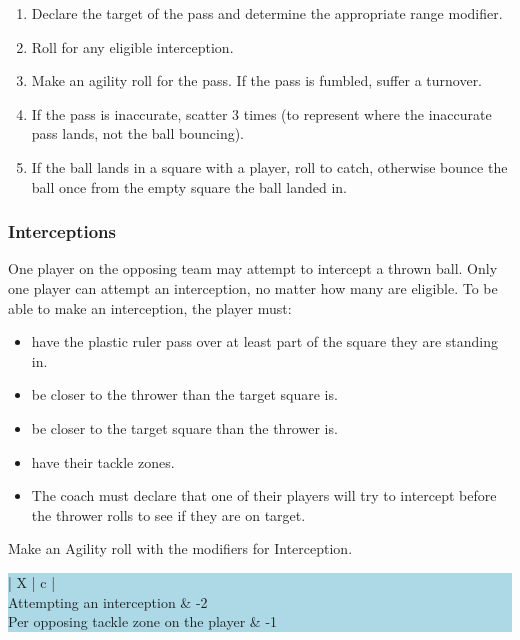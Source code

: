 \begin{multicols}{2}
\begin{enumerate}
\item Declare the target of the pass and determine the appropriate range modifier.
\item Roll for any eligible interception.
\item Make an agility roll for the pass. If the pass is fumbled, suffer a turnover.
\item If the pass is inaccurate, scatter 3 times (to represent where the inaccurate pass lands, not the ball bouncing).
\item If the ball lands in a square with a player, roll to catch, otherwise bounce the ball once from the empty square the ball landed in.
\end{enumerate}

\subsubsection{Interceptions}
\par One player on the opposing team may attempt to intercept a thrown ball. Only one player can attempt an interception, no matter how many are eligible. To be able to make an interception, the player must:

\begin{itemize}
\item have the plastic ruler pass over at least part of the square they are standing in.
\item be closer to the thrower than the target square is.
\item be closer to the target square than the thrower is.
\item have their tackle zones.
\item The coach must declare that one of their players will try to intercept before the thrower rolls to see if they are on target.
\end{itemize}

\par Make an Agility roll with the modifiers for Interception.

\medskip
\begingroup\setlength{\fboxsep}{0pt}\colorbox{lightBlue}{%
\begin{tabularx}{\linewidth}{ | X | c | }
\hline
{} \\
\hline
Attempting an interception & -2 \\
\hline
Per opposing tackle zone on the player & -1 \\
\hline
\end{tabularx}%
}\endgroup
\medskip


\end{multicols}
